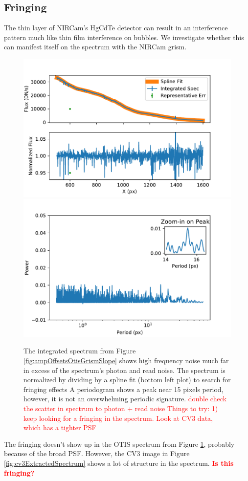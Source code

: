 \documentclass{aastex62}
\begin{document}
\subsection{Fringing}

The thin layer of NIRCam's HgCdTe detector can result in an interference pattern much like thin film interference on bubbles.
We investigate whether this can manifest itself on the spectrum with the NIRCam grism.

\begin{figure}[!hbtp]
\centering
\includegraphics[width=.49\columnwidth]{otis_spec_and_norm.pdf}
\includegraphics[width=.49\columnwidth]{otis_spec_periodogram.pdf}
\caption{The integrated spectrum from Figure \ref{fig:ampOffsetsOtisGrismSlope} shows high frequency noise much far in excess of the spectrum's photon and read noise.
The spectrum is normalized by dividing by a spline fit (bottom left plot) to search for fringing effects
A periodogram shows a peak near 15 pixels period, however, it is not an overwhelming periodic signature.
\textcolor{red}{double check the scatter in spectrum to photon + read noise}
\textcolor{red}{Things to try: 1) keep looking for a fringing in the spectrum. Look at CV3 data, which has a tighter PSF}
}\label{fig:integratedOtisGrismSpec}
\end{figure}

The fringing doesn't show up in the OTIS spectrum from Figure \ref{fig:integratedOtisGrismSpec}, probably because of the broad PSF.
However, the CV3 image in Figure \ref{fig:cv3ExtractedSpectrum} shows a lot of structure in the spectrum.
\textcolor{red}{\bf Is this fringing?}
\end{document}
